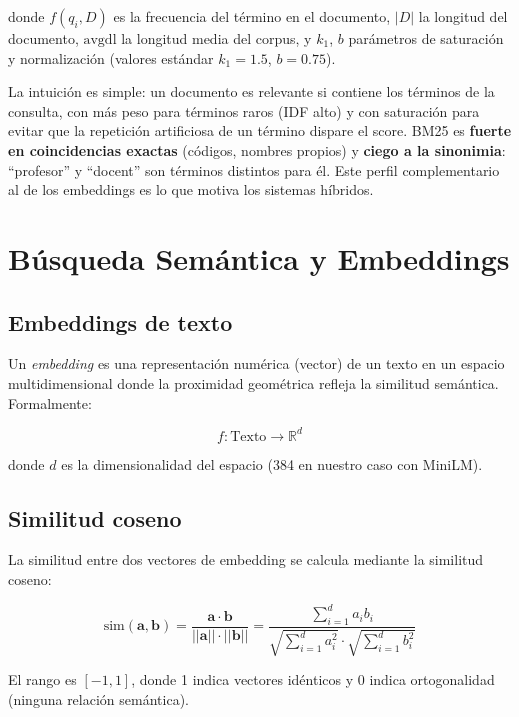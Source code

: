 \documentclass[12pt, a4paper, twoside]{report}
\begin{document}
donde $f(q_i, D)$ es la frecuencia del t\'ermino en el documento, $|D|$ la longitud del documento, $\text{avgdl}$ la longitud media del corpus, y $k_1$, $b$ par\'ametros de saturaci\'on y normalizaci\'on (valores est\'andar $k_1 = 1.5$, $b = 0.75$).

La intuici\'on es simple: un documento es relevante si contiene los t\'erminos de la consulta, con m\'as peso para t\'erminos raros (IDF alto) y con saturaci\'on para evitar que la repetici\'on artificiosa de un t\'ermino dispare el score. BM25 es \textbf{fuerte en coincidencias exactas} (c\'odigos, nombres propios) y \textbf{ciego a la sinonimia}: ``profesor'' y ``docent'' son t\'erminos distintos para \'el. Este perfil complementario al de los embeddings es lo que motiva los sistemas h\'ibridos.

\section{B\'usqueda Sem\'antica y Embeddings}

\subsection{Embeddings de texto}

Un \textit{embedding} es una representaci\'on num\'erica (vector) de un texto en un espacio multidimensional donde la proximidad geom\'etrica refleja la similitud sem\'antica. Formalmente:

\begin{equation}
  f: \text{Texto} \rightarrow \mathbb{R}^d
\end{equation}

donde $d$ es la dimensionalidad del espacio (384 en nuestro caso con MiniLM).

\subsection{Similitud coseno}

La similitud entre dos vectores de embedding se calcula mediante la similitud coseno:

\begin{equation}
  \text{sim}(\mathbf{a}, \mathbf{b}) = \frac{\mathbf{a} \cdot \mathbf{b}}{||\mathbf{a}|| \cdot ||\mathbf{b}||} = \frac{\sum_{i=1}^{d} a_i b_i}{\sqrt{\sum_{i=1}^{d} a_i^2} \cdot \sqrt{\sum_{i=1}^{d} b_i^2}}
\end{equation}

El rango es $[-1, 1]$, donde 1 indica vectores id\'enticos y 0 indica ortogonalidad (ninguna relaci\'on sem\'antica).
\end{document}
